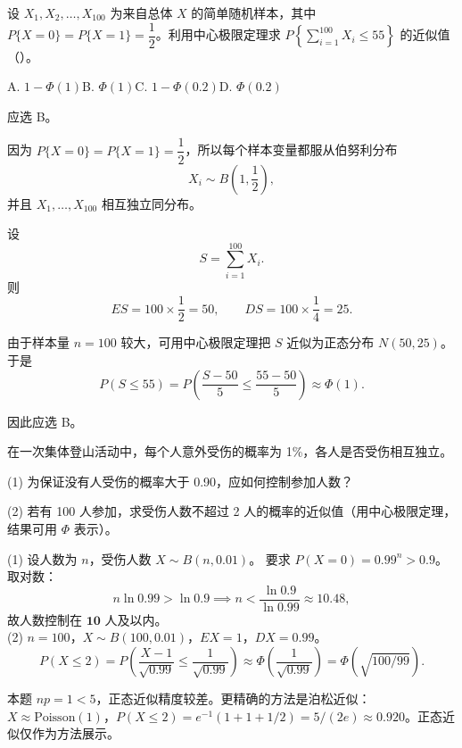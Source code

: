 ﻿\documentclass[lang=cn,11pt]{elegantbook}
\begin{document}
\begin{exercise}\label{exer:5-clt-bernoulli-sum}
设 \(X_1, X_2, \dots, X_{100}\) 为来自总体 \(X\) 的简单随机样本，其中 \(P\{X=0\} = P\{X=1\} = \dfrac{1}{2}\)。利用中心极限定理求 \(P\!\left\{\displaystyle\sum_{i=1}^{100} X_i \leq 55\right\}\) 的近似值（\quad）。\par
A. \(1 - \Phi(1)\)\quad B. \(\Phi(1)\)\quad C. \(1 - \Phi(0.2)\)\quad D. \(\Phi(0.2)\)
\end{exercise}
\begin{solution}
应选 B。

因为 \(P\{X=0\}=P\{X=1\}=\dfrac12\)，所以每个样本变量都服从伯努利分布
\[
X_i\sim B\!\left(1,\frac12\right),
\]
并且 \(X_1,\dots,X_{100}\) 相互独立同分布。

设
\[
S=\sum_{i=1}^{100} X_i.
\]
则
\[
ES=100\times \frac12=50,\qquad DS=100\times \frac14=25.
\]

由于样本量 \(n=100\) 较大，可用中心极限定理把 \(S\) 近似为正态分布 \(N(50,25)\)。于是
\[
P(S \leq 55) = P\!\left(\frac{S - 50}{5} \leq \frac{55 - 50}{5}\right) \approx \Phi(1).
\]

因此应选 B。
\end{solution}

\begin{exercise}\label{exer:5-climb}
在一次集体登山活动中，每个人意外受伤的概率为 1\%，各人是否受伤相互独立。\par
(1) 为保证没有人受伤的概率大于 0.90，应如何控制参加人数？\par
(2) 若有 100 人参加，求受伤人数不超过 2 人的概率的近似值（用中心极限定理，结果可用 \(\Phi\) 表示）。
\end{exercise}
\begin{solution}
(1) 设人数为 \(n\)，受伤人数 \(X \sim B(n, 0.01)\)。
要求 \(P(X = 0) = 0.99^n > 0.9\)。取对数：
\[
n\ln 0.99 > \ln 0.9 \implies n < \frac{\ln 0.9}{\ln 0.99} \approx 10.48,
\]
故人数控制在 \(\mathbf{10}\) 人及以内。\\
(2) \(n = 100\)，\(X \sim B(100, 0.01)\)，\(EX = 1\)，\(DX = 0.99\)。
\[
P(X \leq 2) = P\!\left(\frac{X-1}{\sqrt{0.99}} \leq \frac{1}{\sqrt{0.99}}\right) \approx \Phi\!\left(\frac{1}{\sqrt{0.99}}\right) = \Phi(\sqrt{100/99}).
\]
\begin{note}
本题 \(np = 1 < 5\)，正态近似精度较差。更精确的方法是泊松近似：\(X \approx \text{Poisson}(1)\)，\(P(X \leq 2) = e^{-1}(1+1+1/2) = 5/(2e) \approx 0.920\)。正态近似仅作为方法展示。
\end{note}
\end{solution}
\end{document}
